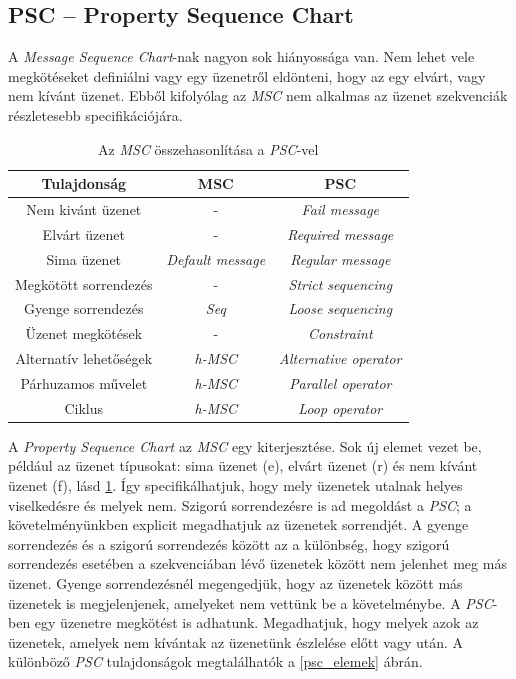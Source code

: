 \subsection{PSC – Property Sequence Chart}
A \textit{Message Sequence Chart}-nak nagyon sok hiányossága van.
Nem lehet vele megkötéseket definiálni vagy egy üzenetről eldönteni, hogy az egy elvárt, vagy nem kívánt üzenet.
Ebből kifolyólag az \textit{MSC} nem alkalmas az üzenet szekvenciák részletesebb specifikációjára.

\begin{table}[ht]
    \centering %
    \begin{tabular}{ |c|c|c| } %
    \hline
    \textbf{Tulajdonság} & \textbf{MSC} & \textbf{PSC} \\ [0.5ex] %
    \hline %
    \hline
    Nem kivánt üzenet & - & \textit{Fail message} \\ %
    \hline
    Elvárt üzenet & - & \textit{Required message} \\
    \hline
    Sima üzenet & \textit{Default message} & \textit{Regular message} \\
    \hline
    Megkötött sorrendezés & - & \textit{Strict sequencing} \\
    \hline
    Gyenge sorrendezés & \textit{Seq} & \textit{Loose sequencing} \\
    \hline
    Üzenet megkötések & - & \textit{Constraint} \\
    \hline
    Alternatív lehetőségek & \textit{h-MSC} & \textit{Alternative operator} \\
    \hline
    Párhuzamos művelet & \textit{h-MSC} & \textit{Parallel operator} \\
    \hline
    Ciklus & \textit{h-MSC} & \textit{Loop operator} \\
    \hline %
    \end{tabular}
    \caption{Az \textit{MSC} összehasonlítása a \textit{PSC}-vel} %
    \label{psc_tablazat} %
\end{table}

A \textit{Property Sequence Chart} \cite{PSC1} az \textit{MSC} egy kiterjesztése.
Sok új elemet vezet be, például az üzenet típusokat: sima üzenet (e), elvárt üzenet (r) és nem kívánt üzenet (f), lásd \ref{psc_tablazat}.
Így specifikálhatjuk, hogy mely üzenetek utalnak helyes viselkedésre és melyek nem.
Szigorú sorrendezésre is ad megoldást a \textit{PSC}; a követelményünkben explicit megadhatjuk az üzenetek sorrendjét.
A gyenge sorrendezés és a szigorú sorrendezés között az a különbség, hogy szigorú sorrendezés esetében a szekvenciában lévő üzenetek között nem jelenhet meg más üzenet.
Gyenge sorrendezésnél megengedjük, hogy az üzenetek között más üzenetek is megjelenjenek, amelyeket nem vettünk be a követelménybe.
A \textit{PSC}-ben egy üzenetre megkötést is adhatunk.
Megadhatjuk, hogy melyek azok az üzenetek, amelyek nem kívántak az üzenetünk észlelése előtt vagy után.
A különböző \textit{PSC} tulajdonságok megtalálhatók a \ref{psc_elemek} ábrán.

